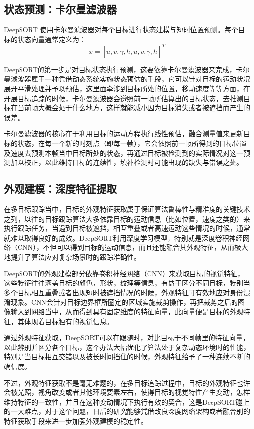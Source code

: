 \subsection{状态预测：卡尔曼滤波器}

DeepSORT 使用卡尔曼滤波器对每个目标进行状态建模与短时位置预测。每个目标的状态向量通常定义为：
\[x = [u, v, \gamma, h, \dot{u}, \dot{v}, \dot{\gamma}, \dot{h}]^{T}\]

DeepSORT的第一步是对目标状态执行预测，这要依靠卡尔曼滤波器来完成，卡尔曼滤波器属于一种凭借动态系统实施状态预估的手段，它可以针对目标的运动状况展开平滑处理并予以预估，这里面牵涉到目标所处的位置，移动速度等等方面，在开展目标追踪的时候，卡尔曼滤波器会遵照前一帧所估算出的目标状态，去推测目标在当前帧大概会处于什么地方，这样就能减小因为目标消失或者被遮挡而产生的误差。

卡尔曼滤波器的核心在于利用目标的运动方程执行线性预估，融合测量值来更新目标的状态，在每一个新的时刻点（即每一帧），它会依照前一帧所得到的目标位置及速度去预测本帧当中目标所处的状态，再通过目标被检测到的实际情况对这一预测加以校正，以此维持目标的连续性，填补检测时可能出现的缺失与错误之处。


\subsection{外观建模：深度特征提取}

在多目标跟踪当中，目标的外观特征获取属于保证算法鲁棒性与精准度的关键技术之列，以往的目标跟踪算法大多依靠目标的运动信息（比如位置，速度之类的）来执行跟踪任务，当遇到目标被遮挡，相互重叠或者高速运动这些情况的时候，通常就难以取得良好的成效。DeepSORT利用深度学习模型，特别就是深度卷积神经网络（CNN），不但可以得到目标的运动信息，而且还能融合其外观特征，从而极大地提升了算法应对复杂场景时的跟踪准确性。

DeepSORT的外观建模部分依靠卷积神经网络（CNN）来获取目标的视觉特征，这些特征往往涵盖目标的颜色，形状，纹理等信息，有益于区分不同目标，特别当多个目标相互重叠或者出现短时被遮挡情况的时候，外观特征可有效地应对身份混淆现象。CNN会针对目标边界框所圈定的区域实施裁剪操作，再把裁剪之后的图像输入到网络当中，从而得到具有固定维度的特征向量，此向量便是目标的外观特征，其体现着目标独有的视觉信息。

通过外观特征获取，DeepSORT可以在跟随时，对比目标于不同帧里的特征向量，以此辨别并区分各个目标，这个办法大幅优化了算法处于复杂动态环境时的性能，特别是当目标相互交错以及被长时间挡住的时候，外观特征给予了一种连续不断的确信度。

不过，外观特征获取不是毫无难题的，在多目标追踪过程中，目标的外观特征也许会被光照，视角改变或者其他环境要素左右，使得目标的视觉特性产生变动，怎样维持特征的一致性，并且在这种变动情况下执行有效的契合，这是DeepSORT碰上的一大难点，对于这个问题，日后的研究能够凭借改良深度网络架构或者融合别的特征获取手段来进一步加强外观建模的稳定性。

